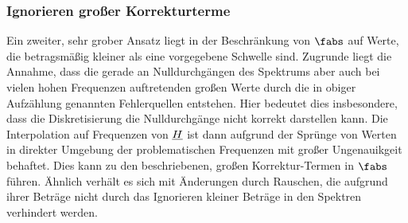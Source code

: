 \documentclass[../Report.tex]{subfiles}
\begin{document}
\subsubsection*{Ignorieren großer Korrekturterme}
\label{subsubsec:opt.H.RMS}

Ein zweiter, sehr grober Ansatz liegt in der Beschränkung von $\fabs$ auf Werte, die betragsmäßig kleiner als eine vorgegebene Schwelle sind. Zugrunde liegt die Annahme, dass die gerade an Nulldurchgängen des Spektrums aber auch bei vielen hohen Frequenzen auftretenden großen Werte durch die in obiger Aufzählung genannten Fehlerquellen entstehen.
Hier bedeutet dies insbesondere, dass die Diskretisierung die Nulldurchgänge nicht korrekt darstellen kann. Die Interpolation auf Frequenzen von $\underline{H}$ ist dann aufgrund der Sprünge von Werten in direkter Umgebung der problematischen Frequenzen mit großer Ungenauikgeit behaftet. Dies kann zu den beschriebenen, großen Korrektur-Termen in $\fabs$ führen. Ähnlich verhält es sich mit Änderungen durch Rauschen, die aufgrund ihrer Beträge nicht durch das Ignorieren kleiner Beträge in den Spektren verhindert werden.
\end{document}
